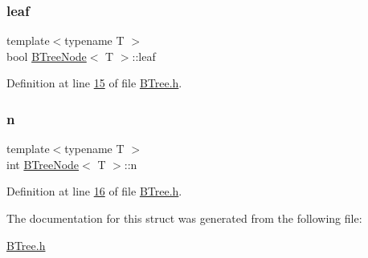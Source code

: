 \subsubsection{\texorpdfstring{leaf}{leaf}}
{\footnotesize\ttfamily template$<$typename T $>$ \\
bool \hyperlink{structBTreeNode}{B\+Tree\+Node}$<$ T $>$\+::leaf}



Definition at line \hyperlink{BTree_8h_source_l00015}{15} of file \hyperlink{BTree_8h_source}{B\+Tree.\+h}.

\mbox{\label{structBTreeNode_ac6993709a99bec1116e1c6dccc3c0f8a}} 
\subsubsection{\texorpdfstring{n}{n}}
{\footnotesize\ttfamily template$<$typename T $>$ \\
int \hyperlink{structBTreeNode}{B\+Tree\+Node}$<$ T $>$\+::n}



Definition at line \hyperlink{BTree_8h_source_l00016}{16} of file \hyperlink{BTree_8h_source}{B\+Tree.\+h}.



The documentation for this struct was generated from the following file\+:\begin{DoxyCompactItemize}
\item 
\hyperlink{BTree_8h}{B\+Tree.\+h}\end{DoxyCompactItemize}
